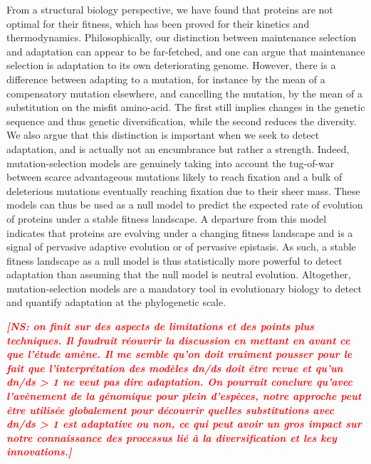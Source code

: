 \documentclass{article}
\newcommand{\NS}[1]{\textcolor{red}{\textbf{\emph{[NS: #1]}}}}
\begin{document}
    From a structural biology perspective, we have found that proteins are not optimal for their fitness, which has been proved for their kinetics and thermodynamics\cite{taverna_why_2002, goldstein_evolution_2011}.
    Philosophically, our distinction between maintenance selection and adaptation can appear to be far-fetched, and one can argue that maintenance selection is adaptation to its own deteriorating genome.
    However, there is a difference between adapting to a mutation, for instance by the mean of a compensatory mutation elsewhere, and cancelling the mutation, by the mean of a substitution on the misfit amino-acid.
    The first still implies changes in the genetic sequence and thus genetic diversification, while the second reduces the diversity.
    We also argue that this distinction is important when we seek to detect adaptation, and is actually not an encumbrance but rather a strength.
    Indeed, mutation-selection models are genuinely taking into account the tug-of-war between scarce advantageous mutations likely to reach fixation and a bulk of deleterious mutations eventually reaching fixation due to their sheer mass.
    These models can thus be used as a null model to predict the expected rate of evolution of proteins\cite{spielman_relationship_2015, dosreis_how_2015} under a stable fitness landscape.
    A departure from this model indicates that proteins are evolving under a changing fitness landscape\cite{rodrigue_detecting_2017, tamuri_mutationselection_2021} and is a signal of pervasive adaptive evolution\cite{rodrigue_bayesian_2021} or of pervasive epistasis\cite{rodrigue_detecting_2017}.
    As such, a stable fitness landscape as a null model is thus statistically more powerful to detect adaptation than assuming that the null model is neutral evolution.
    Altogether, mutation-selection models are a mandatory tool in evolutionary biology to detect and quantify adaptation at the phylogenetic scale.

    \NS{on finit sur des aspects de limitations et des points plus techniques. Il faudrait réouvrir la discussion en mettant en avant ce que l'étude amène. Il me semble qu'on doit vraiment pousser pour le fait que l'interprétation des modèles dn/ds doit être revue et qu'un dn/ds > 1 ne veut pas dire adaptation. On pourrait conclure qu'avec l'avènement de la génomique pour plein d'espèces, notre approche peut être utilisée globalement pour découvrir quelles substitutions avec dn/ds > 1 est adaptative ou non, ce qui peut avoir un gros impact sur notre connaissance des processus lié à la diversification et les key innovations.}
\end{document}
